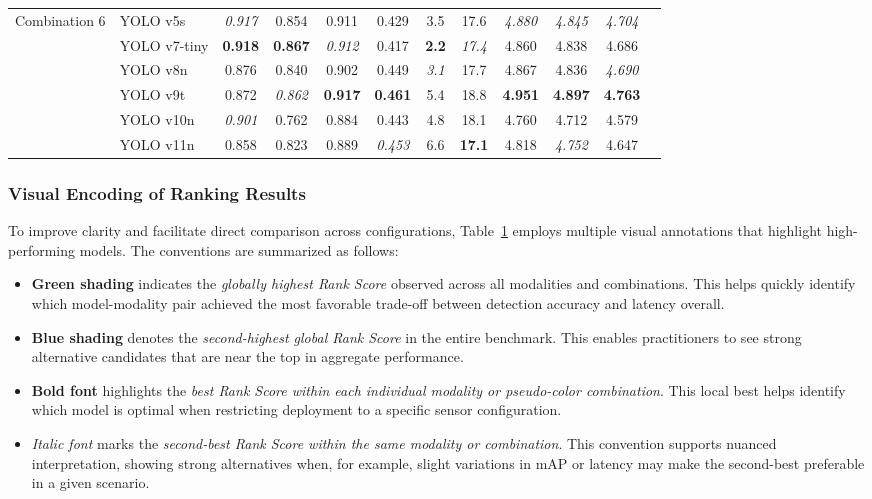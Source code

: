 \documentclass[runningheads]{llncs}
\begin{document}
\begin{table}[h!]
\begin{tabular}{@{}llcccccccccc@{}}
\midrule
\multirow{}{}{Combination 6}
& YOLO v5s 
& \textit{0.917} & 0.854 & 0.911 & 0.429 
& 3.5 & 17.6 
& \textit{4.880} & \textit{4.845} & \textit{4.704} \\
& YOLO v7-tiny 
& \textbf{0.918} & \textbf{0.867} & \textit{0.912} & 0.417 
& \textbf{2.2} & \textit{17.4} 
& 4.860 & 4.838 & 4.686 \\
& YOLO v8n 
& 0.876 & 0.840 & 0.902 & 0.449 
& \textit{3.1} & 17.7 
& 4.867 & 4.836 & \textit{4.690} \\
& YOLO v9t 
& 0.872 & \textit{0.862} & \textbf{0.917} & \textbf{0.461} 
& 5.4 & 18.8 
& \textbf{4.951} & \textbf{4.897} & \textbf{4.763} \\
& YOLO v10n 
& \textit{0.901} & 0.762 & 0.884 & 0.443 
& 4.8 & 18.1 
& 4.760 & 4.712 & 4.579 \\
& YOLO v11n 
& 0.858 & 0.823 & 0.889 & \textit{0.453} 
& 6.6 & \textbf{17.1} 
& 4.818 & \textit{4.752} & 4.647 \\

\bottomrule   
    \end{tabular}   
    \label{tab:yolo_results}
\end{table}

\subsubsection{Visual Encoding of Ranking Results}

To improve clarity and facilitate direct comparison across configurations, Table~\ref{tab:yolo_results} employs multiple visual annotations that highlight high-performing models. The conventions are summarized as follows:

\begin{itemize}
    \item {}\textbf{Green shading} indicates the \emph{globally highest Rank Score} observed across all modalities and combinations. This helps quickly identify which model-modality pair achieved the most favorable trade-off between detection accuracy and latency overall.
    \item {}\textbf{Blue shading} denotes the \emph{second-highest global Rank Score} in the entire benchmark. This enables practitioners to see strong alternative candidates that are near the top in aggregate performance.
    \item \textbf{Bold font} highlights the \emph{best Rank Score within each individual modality or pseudo-color combination}. This local best helps identify which model is optimal when restricting deployment to a specific sensor configuration.
    \item \textit{Italic font} marks the \emph{second-best Rank Score within the same modality or combination}. This convention supports nuanced interpretation, showing strong alternatives when, for example, slight variations in mAP or latency may make the second-best preferable in a given scenario.
\end{itemize}
\end{document}
